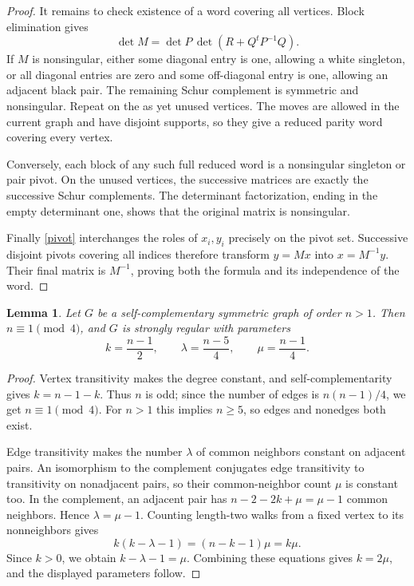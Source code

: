 \documentclass[11pt]{article}
\newtheorem{lemma}{Lemma}
\begin{document}
\begin{proof}
It remains to check existence of a word covering all vertices.
Block elimination gives
\[
 \det M=\det P\,\det(R+Q^tP^{-1}Q).
\]
If \(M\) is nonsingular, either some diagonal entry is one, allowing
a white singleton, or all diagonal entries are zero and some
off-diagonal entry is one, allowing an adjacent black pair.
The remaining Schur complement is symmetric and nonsingular.
Repeat on the as yet unused vertices. The moves are allowed in
the current graph and have disjoint supports, so they give a reduced
parity word covering every vertex.

Conversely, each block of any such full reduced word is a nonsingular
singleton or pair pivot. On the unused vertices, the successive
matrices are exactly the successive Schur complements. The determinant
factorization, ending in the empty determinant one, shows that the
original matrix is nonsingular.

Finally \eqref{pivot} interchanges the roles of \(x_i,y_i\) precisely
on the pivot set. Successive disjoint pivots covering all indices
therefore transform \(y=Mx\) into \(x=M^{-1}y\). Their final matrix is
\(M^{-1}\), proving both the formula and its independence of the word.
\end{proof}

\begin{lemma}\label{parameters}
Let \(G\) be a self-complementary symmetric graph of order \(n>1\).
Then \(n\equiv1\pmod4\), and \(G\) is strongly regular with parameters
\[
 k=\frac{n-1}{2},\qquad \lambda=\frac{n-5}{4},\qquad
 \mu=\frac{n-1}{4}.
\]
\end{lemma}
\begin{proof}
Vertex transitivity makes the degree constant, and self-complementarity
gives \(k=n-1-k\). Thus \(n\) is odd; since the number of edges is
\(n(n-1)/4\), we get \(n\equiv1\pmod4\).
For \(n>1\) this implies \(n\ge5\), so edges and nonedges both exist.

Edge transitivity makes the number \(\lambda\) of common neighbors
constant on adjacent pairs. An isomorphism to the complement
conjugates edge transitivity to transitivity on nonadjacent pairs,
so their common-neighbor count \(\mu\) is constant too.
In the complement, an adjacent pair has \(n-2-2k+\mu=\mu-1\)
common neighbors. Hence \(\lambda=\mu-1\).
Counting length-two walks from a fixed vertex to its nonneighbors
gives
\[
 k(k-\lambda-1)=(n-k-1)\mu=k\mu.
\]
Since \(k>0\), we obtain \(k-\lambda-1=\mu\). Combining these equations
gives \(k=2\mu\), and the displayed parameters follow.
\end{proof}
\end{document}

